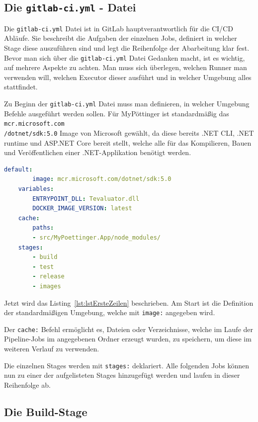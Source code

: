 \subsection{Die {\texttt{gitlab-ci.yml}} - Datei }

Die \texttt{gitlab-ci.yml} Datei ist in GitLab hauptverantwortlich für die CI/CD Abläufe. Sie beschreibt die Aufgaben der einzelnen Jobs, definiert in welcher Stage diese auszuführen sind und legt die Reihenfolge der Abarbeitung klar fest. Bevor man sich über die \texttt{gitlab-ci.yml} Datei Gedanken macht, ist es wichtig, auf mehrere Aspekte zu achten. Man muss sich überlegen, welchen Runner man verwenden will, welchen Executor dieser ausführt und in welcher Umgebung alles stattfindet.

Zu Beginn der \texttt{gitlab-ci.yml} Datei muss man definieren, in welcher Umgebung Befehle ausgeführt werden sollen. Für MyPöttinger ist standardmäßig das \texttt{mcr.microsoft.com\\/dotnet/sdk:5.0} Image von Microsoft gewählt, da diese bereits .NET CLI, .NET runtime und ASP.NET Core bereit stellt, welche alle für das Kompilieren, Bauen und Veröffentlichen einer .NET-Applikation benötigt werden.

\begin{lstlisting}[caption={Erste Zeilen der gitlab-ci.yml Datei}, language=yaml, label={lst:lstErsteZeilen}]
	default:
		image: mcr.microsoft.com/dotnet/sdk:5.0
	variables:
		ENTRYPOINT_DLL: Tevaluator.dll
		DOCKER_IMAGE_VERSION: latest
	cache:
		paths:
		- src/MyPoettinger.App/node_modules/
	stages:
		- build
		- test
		- release
		- images
\end{lstlisting}

Jetzt wird das Listing~\ref{lst:lstErsteZeilen} beschrieben. Am Start ist die Definition der standardmäßigen Umgebung, welche mit \texttt{image:} angegeben wird. 

Der \texttt{cache:} Befehl ermöglicht es, Dateien oder Verzeichnisse, welche im Laufe der Pipeline-Jobs im angegebenen Ordner erzeugt wurden, zu speichern, um diese im weiteren Verlauf zu verwenden.

Die einzelnen Stages werden mit \texttt{stages:} deklariert. Alle folgenden Jobs können nun zu einer der aufgelisteten Stages hinzugefügt werden und laufen in dieser Reihenfolge ab.

\subsection{Die Build-Stage}\label{sssec:lblBuildStage}


